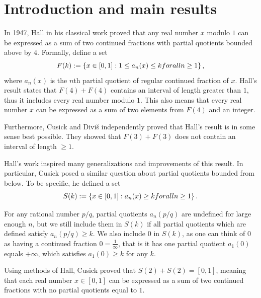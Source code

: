 \documentclass{amsart}
\theoremstyle{definition}
\newcommand{\Z}{\mathbb Z}
\newcommand{\0}{\mbf 0}%
\renewcommand{\text}{\textup}
\def\Z{\mathbb Z}
\begin{document}
\section{Introduction and main results}

In 1947, Hall in his classical work \cite{MR0022568} proved that any real number $x$ modulo $1$ can be expressed as a sum of two continued fractions with partial quotients bounded above by $4$. 
Formally, define a set
$$
F(k) := \left\{ x\in[0,1]:  1\leq a_n(x) \leq k \text{ for all } n\geq1          \right\},
$$
where $a_n(x)$ is the $n$th partial quotient of regular continued fraction of $x$. Hall's result states that
$
F(4)+F(4)
$
contains an interval of length greater than $1$, thus it includes every real number modulo $1$. This also means that every real number $x$ can be expressed as a sum of two elements from $F(4)$ and an integer.

Furthermore, Cusick \cite{MR0309875} and Diviš \cite{MR0371826} independently proved that Hall's result is in some sense best possible. They showed that 
$ F(3)+F(3)$ does not contain an interval of length $\geq1$.

Hall's work inspired many generalizations and improvements of this result. In particular, Cusick posed a similar question about partial quotients bounded from below. To be specific, he defined a set
$$
S(k) := \left\{ x\in[0,1]:    a_n(x) \geq k \text{ for all } n\geq1          \right\}.
$$

For any rational number $p/q$, partial quotients $a_n(p/q)$ are undefined for large enough $n$, but we still include them in $S(k)$ if all partial quotients which are defined satisfy $a_n(p/q)\geq k$. We also include $0$ in $S(k)$, as one can think of $0$ as having a continued fraction $0=\frac{1}{\infty}$, that is it has one partial quotient $a_1(0)$ equals $+\infty$, which satisfies $a_1(0)\geq k$ for any $k$.


Using methods of Hall, Cusick \cite{MR0269603} proved that $S(2)+S(2)=[0,1]$, meaning that each real number $x\in [0,1]$ can be expressed as a sum of two continued fractions with no partial quotients equal to $1$.
\end{document}
